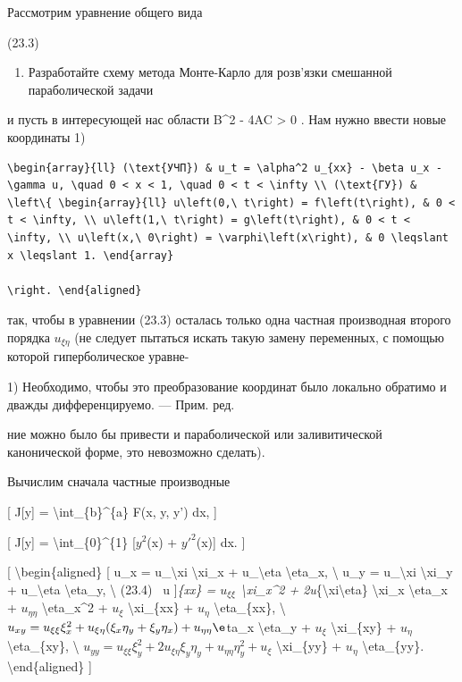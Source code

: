 \documentclass[
]{article}
\providecommand{\tightlist}{%
  \setlength{\itemsep}{0pt}\setlength{\parskip}{0pt}}
\begin{document}
{{Рассмотрим уравнение общего вида

(23.3)

\begin{enumerate}
\def\labelenumi{\arabic{enumi}.}
\setcounter{enumi}{4}
\tightlist
\item
  Разработайте схему метода Монте-Карло для розв'язки смешанной
  параболической задачи
\end{enumerate}

и пусть в интересующей нас области B\^{}2 - 4AC \textgreater{} 0 . Нам
нужно ввести новые координаты 1)

\begin{verbatim}
\begin{array}{ll} (\text{УЧП}) & u_t = \alpha^2 u_{xx} - \beta u_x - \gamma u, \quad 0 < x < 1, \quad 0 < t < \infty \\ (\text{ГУ}) & \left\{ \begin{array}{ll} u\left(0,\ t\right) = f\left(t\right), & 0 < t < \infty, \\ u\left(1,\ t\right) = g\left(t\right), & 0 < t < \infty, \\ u\left(x,\ 0\right) = \varphi\left(x\right), & 0 \leqslant x \leqslant 1. \end{array}

\right. \end{aligned}
\end{verbatim}

так, чтобы в уравнении (23.3) осталась только одна частная производная
второго порядка \(u_{\xi\eta}\) (не следует пытаться искать такую замену
переменных, с помощью которой гиперболическое уравне-

1) Необходимо, чтобы это преобразование координат было локально обратимо
и дважды дифференцируемо. --- Прим. ред.

ние можно было бы привести и параболической или заливитической
канонической форме, это невозможно сделать).

Вычислим сначала частные производные

{[} J{[}y{]} = \textbackslash int\_\{b\}\^{}\{a\} F(x, y, y') dx, {]}

{[} J{[}y{]} = \textbackslash int\_\{0\}\^{}\{1\} {[}\(y^{2}\)(x) +
\(y'^{2}\)(x){]} dx. {]}

{[} \textbackslash begin\{aligned\} {[} u\_x = u\_\textbackslash xi
\textbackslash xi\_x + u\_\textbackslash eta \textbackslash eta\_x,
\textbackslash{} u\_y = u\_\textbackslash xi \textbackslash xi\_y +
u\_\textbackslash eta \textbackslash eta\_y, \textbackslash{} (23.4) ~u
{]}\emph{\{xx\} = \(u_{\xi\xi}\) \textbackslash xi\_x\^{}2 +
2u}\{\textbackslash xi\textbackslash eta\} \textbackslash xi\_x
\textbackslash eta\_x + \(u_{\eta\eta}\) \textbackslash eta\_x\^{}2 +
\(u_{\xi}\) \textbackslash xi\_\{xx\} + \(u_{\eta}\)
\textbackslash eta\_\{xx\}, \textbackslash{}
\(u_{xy} = u_{\xi\xi} \xi_x^2 + u_{\xi\eta} (\xi_x \eta_y + \xi_y \eta_x) + u_{\eta\eta} \e\)ta\_x
\textbackslash eta\_y + \(u_{\xi}\) \textbackslash xi\_\{xy\} +
\(u_{\eta}\) \textbackslash eta\_\{xy\}, \textbackslash{}
\(u_{yy} = u_{\xi\xi} \xi_y^2 + 2u_{\xi\eta} \xi_y \eta_y + u_{\eta\eta} \eta_y^2 + u_{\xi}\)
\textbackslash xi\_\{yy\} + \(u_{\eta}\) \textbackslash eta\_\{yy\}.
\textbackslash end\{aligned\} {]}

}}
\end{document}

